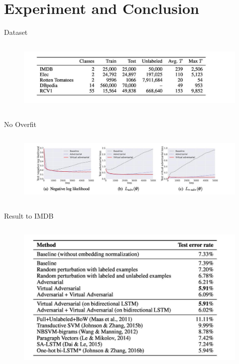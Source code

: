 \section{Experiment and Conclusion}

\begin{frame}{Dataset}
\begin{columns}[onlytextwidth]

		\begin{figure}
			\includegraphics[width=.9\linewidth]{dataset.jpg}
		\end{figure}
	\end{columns}
\end{frame}

\begin{frame}{No Overfit}
	\begin{columns}[onlytextwidth]
		
		\begin{figure}
			\includegraphics[width=.9\linewidth]{quxian.jpg}
		\end{figure}
	\end{columns}
\end{frame}

\begin{frame}{Result to IMDB}
	\begin{columns}[onlytextwidth]
		
		\column{.9\textwidth}
		\begin{figure}
			\includegraphics[width=.9\linewidth]{imdb.jpg}
		\end{figure}
	\end{columns}
\end{frame}

